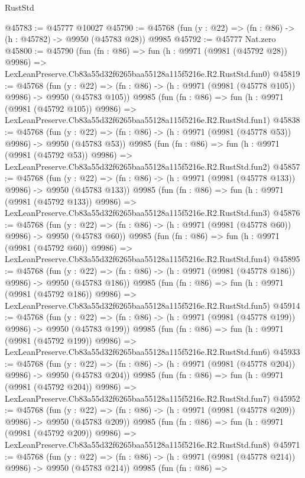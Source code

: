\begin{lexlean}{RustStd}
\begin{coremodule}
@45783 := @45777 @10027
@45790 := @45768 (fun (y : @22) => (fn : @86) -> (h : @45782) -> @9950 (@45783 @28)) @9985
@45792 := @45777 Nat.zero
@45800 := @45790
    (fun (fn : @86) =>
    fun (h : @9971 (@9981 (@45792 @28)) @9986) =>
    LexLeanPreserve.Cb83a55d32f6265baa55128a115f5216e.R2.RustStd.fun0)
@45819 := @45768
    (fun (y : @22) => (fn : @86) -> (h : @9971 (@9981 (@45778 @105)) @9986) -> @9950 (@45783 @105))
    @9985
    (fun (fn : @86) =>
    fun (h : @9971 (@9981 (@45792 @105)) @9986) =>
    LexLeanPreserve.Cb83a55d32f6265baa55128a115f5216e.R2.RustStd.fun1)
@45838 := @45768
    (fun (y : @22) => (fn : @86) -> (h : @9971 (@9981 (@45778 @53)) @9986) -> @9950 (@45783 @53))
    @9985
    (fun (fn : @86) =>
    fun (h : @9971 (@9981 (@45792 @53)) @9986) =>
    LexLeanPreserve.Cb83a55d32f6265baa55128a115f5216e.R2.RustStd.fun2)
@45857 := @45768
    (fun (y : @22) => (fn : @86) -> (h : @9971 (@9981 (@45778 @133)) @9986) -> @9950 (@45783 @133))
    @9985
    (fun (fn : @86) =>
    fun (h : @9971 (@9981 (@45792 @133)) @9986) =>
    LexLeanPreserve.Cb83a55d32f6265baa55128a115f5216e.R2.RustStd.fun3)
@45876 := @45768
    (fun (y : @22) => (fn : @86) -> (h : @9971 (@9981 (@45778 @60)) @9986) -> @9950 (@45783 @60))
    @9985
    (fun (fn : @86) =>
    fun (h : @9971 (@9981 (@45792 @60)) @9986) =>
    LexLeanPreserve.Cb83a55d32f6265baa55128a115f5216e.R2.RustStd.fun4)
@45895 := @45768
    (fun (y : @22) => (fn : @86) -> (h : @9971 (@9981 (@45778 @186)) @9986) -> @9950 (@45783 @186))
    @9985
    (fun (fn : @86) =>
    fun (h : @9971 (@9981 (@45792 @186)) @9986) =>
    LexLeanPreserve.Cb83a55d32f6265baa55128a115f5216e.R2.RustStd.fun5)
@45914 := @45768
    (fun (y : @22) => (fn : @86) -> (h : @9971 (@9981 (@45778 @199)) @9986) -> @9950 (@45783 @199))
    @9985
    (fun (fn : @86) =>
    fun (h : @9971 (@9981 (@45792 @199)) @9986) =>
    LexLeanPreserve.Cb83a55d32f6265baa55128a115f5216e.R2.RustStd.fun6)
@45933 := @45768
    (fun (y : @22) => (fn : @86) -> (h : @9971 (@9981 (@45778 @204)) @9986) -> @9950 (@45783 @204))
    @9985
    (fun (fn : @86) =>
    fun (h : @9971 (@9981 (@45792 @204)) @9986) =>
    LexLeanPreserve.Cb83a55d32f6265baa55128a115f5216e.R2.RustStd.fun7)
@45952 := @45768
    (fun (y : @22) => (fn : @86) -> (h : @9971 (@9981 (@45778 @209)) @9986) -> @9950 (@45783 @209))
    @9985
    (fun (fn : @86) =>
    fun (h : @9971 (@9981 (@45792 @209)) @9986) =>
    LexLeanPreserve.Cb83a55d32f6265baa55128a115f5216e.R2.RustStd.fun8)
@45971 := @45768
    (fun (y : @22) => (fn : @86) -> (h : @9971 (@9981 (@45778 @214)) @9986) -> @9950 (@45783 @214))
    @9985
    (fun (fn : @86) =>

\end{coremodule}
\end{lexlean}
